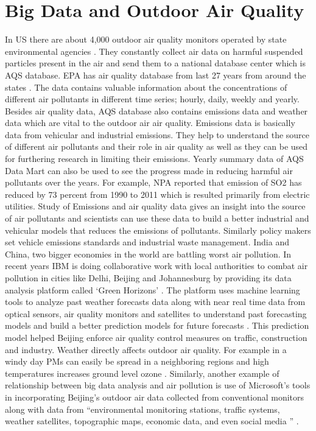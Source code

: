 \documentclass[sigconf]{acmart}
\begin{document}
{  \section{Big Data and Outdoor Air Quality} In US there are about 4,000 outdoor air quality monitors operated by state environmental agencies \cite{outdoor-air}. They constantly collect air data on harmful suspended particles present in the air and send them to a national database center which is AQS database. EPA has air quality database from last 27 years from around the states \cite{googlecloud}. The data contains valuable information about the concentrations of different air pollutants in different time series; hourly, daily, weekly and yearly. Besides air quality data, AQS database also contains emissions data and weather data which are vital to the outdoor air air quality. Emissions data is basically data from vehicular and industrial emissions. They help to  understand the source of different air pollutants and their role in air quality as well as they can be used for furthering research in limiting their emissions. Yearly summary data of AQS Data Mart can also be used to see the progress made in reducing harmful air pollutants over the years. For example, NPA reported that emission of SO2 has reduced by 73 percent from 1990 to 2011 which is resulted primarily from electric utilities. Study of Emissions and air quality data gives an insight into the source of air pollutants and scientists can use these data to build a better industrial and vehicular models that reduces the emissions of pollutants. Similarly policy makers set vehicle emissions standards and industrial waste management.
  India and China, two bigger economies in the world are battling worst air pollution. In recent years IBM is doing collaborative work with local authorities to combat air pollution in cities like Delhi, Beijing and Johannesburg by providing its data analysis platform called `Green Horizons' \cite{www-huffingtonpost-com}. The platform uses machine learning tools to analyze past weather forecasts data along with near real time data from optical sensors, air quality monitors and satellites to understand past forecasting models and build a better prediction models for future forecasts \cite{www-huffingtonpost-com}. This prediction model helped Beijing enforce air quality control measures on traffic, construction and industry.
  Weather directly affects outdoor air quality. For example in a windy day PMs can easily be spread in a neighboring regions and high temperatures increases ground level ozone \cite{www-huffingtonpost-com}. Similarly, another example of relationship between big data analysis and air pollution is use of Microsoft's tools in incorporating Beijing's outdoor air data collected from conventional monitors along with data from ``environmental monitoring stations, traffic systems, weather satellites, topographic maps, economic data, and even social media '' \cite{spectrum-ieee}.
}
\end{document}
